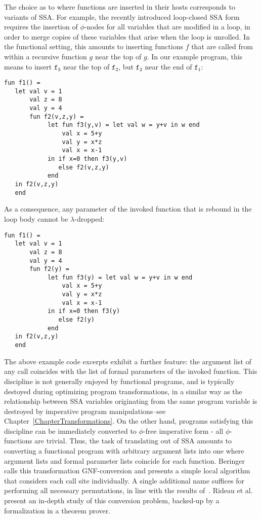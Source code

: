 The choice as to where functions are inserted in their hosts
corresponds to variants of SSA. For example, the recently introduced
loop-closed SSA form~\cite{} requires the insertion of $\phi$-nodes
for all variables that are modified in a loop, in order to merge
copies of these variables that arise when the loop is unrolled.  In
the functional setting, this amounts to inserting functions $f$ that
are called from within a recursive function $g$ near
the top of $g$. In our example program, this means to insert
$\mathtt{f_3}$ near the top of $\mathtt{f_2}$, but $\mathtt{f_2}$ near
the end of $\mathtt{f_1}$:
\begin{verbatim}
fun f1() = 
   let val v = 1 
       val z = 8 
       val y = 4
       fun f2(v,z,y) = 
            let fun f3(y,v) = let val w = y+v in w end
                val x = 5+y
                val y = x*z
                val x = x-1
            in if x=0 then f3(y,v)
               else f2(v,z,y) 
            end
   in f2(v,z,y) 
   end
\end{verbatim}
As a consequence, any parameter of the invoked function that is
rebound in the loop body cannot be $\lambda$-dropped:
\begin{verbatim}
fun f1() = 
   let val v = 1 
       val z = 8 
       val y = 4
       fun f2(y) = 
            let fun f3(y) = let val w = y+v in w end
                val x = 5+y
                val y = x*z
                val x = x-1
            in if x=0 then f3(y)
               else f2(y) 
            end
   in f2(v,z,y) 
   end
\end{verbatim}

The above example code excerpts exhibit a further feature: the
argument list of any call coincides with the list of formal parameters
of the invoked function. This discipline is not generally enjoyed by
functional programs, and is typically destoyed during optimizing
program transformations, in a similar way as the relationship between
SSA variables originating from the same program variable is destroyed
by imperative program manipulations--see
Chapter~\ref{ChapterTransformations}. On the other hand, programs
satisfying this discipline can be immediately converted to $\phi$-free
imperative form - all $\phi$-functions are trivial. Thus, the task of
translating out of SSA amounts to converting a functional program with
arbitrary argument lists into one where argument lists and formal
parameter lists coincide for each
function. Beringer~\cite{DBLP:journals/entcs/Beringer07} calls this
transformation GNF-conversion and presents a simple local algorithm
that considers each call site individually. A single additional name
suffices for performing all necessary permutations, in line with the
results of~\cite{May}. Rideau et
al.~\cite{DBLP:journals/jar/RideauSL08} present an in-depth study of
this conversion problem, backed-up by a formalization in a theorem
prover.

